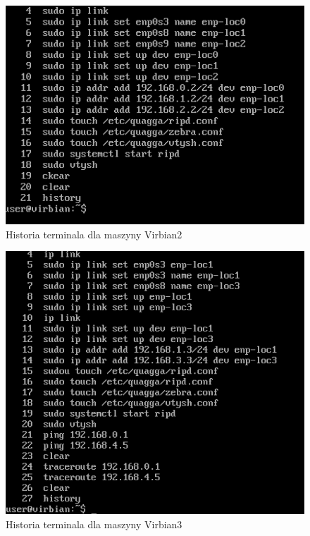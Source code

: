 \documentclass[a4paper]{scrartcl}
\begin{document}
\begin{figure}
  \includegraphics[width=\linewidth]{hvib2.png}
  \caption{Historia terminala dla maszyny Virbian2}
\end{figure}
\begin{figure}
  \includegraphics[width=\linewidth]{hvib3.png}
  \caption{Historia terminala dla maszyny Virbian3}
\end{figure}
\end{document}
